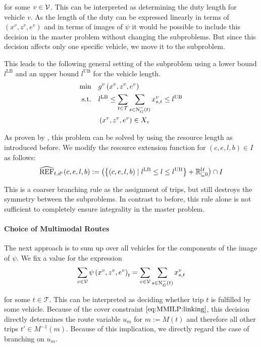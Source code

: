 for some $v\in\mathcal{V}$. This can be interpreted as determining the duty length for vehicle $v$. As the length of the duty can be expressed linearly in terms of $\left(x^v,z^v,e^v\right)$ and in terms of images of $\psi$ it would be possible to include this decision in the master problem without changing the subproblems. But since this decision affects only one specific vehicle, we move it to the subproblem.

This leads to the following general setting of the subproblem using a lower bound $l^{\operatorname{LB}}$ and an upper bound $l^{\operatorname{UB}}$ for the vehicle length.
\begin{align}
	\min \quad & g^v\left(x^v,z^v,e^v\right) \nonumber \\
	\text{s.t.} \quad & l^{\operatorname{LB}} \leq \sum_{t\in\mathcal{T}} \sum_{s\in\operatorname{N}_G^-(t)} x^v_{s,t} \leq l^{\operatorname{UB}} \label{eq:SPv:duty_length} \\
	& \left(x^v,z^v,e^v\right)\in X_v \nonumber
\end{align}

As proven by \cite{Kaiser}, this problem can be solved by using the resource length as introduced before. We modify the resource extension function for $(c,e,l,b)\in I$ as follows:
\begin{align*}
	\widehat{\operatorname{REF}}_{t,d^{\operatorname{e}}}(c,e,l,b) := \left(\left\{(c,e,l,b)\mid l^{\operatorname{LB}}\leq l \leq l^{\operatorname{UB}}\right\} + \mathbb{R}^{\mathcal{U}}_{\sqsubseteq 0}\right) \cap I
\end{align*}

This is a coarser branching rule as the assignment of trips, but still destroys the symmetry between the subproblems. In contrast to before, this rule alone is not sufficient to completely ensure integrality in the master problem.

\paragraph{Choice of Multimodal Routes} \parfill

The next approach is to sum up over all vehicles for the components of the image of $\psi$. We fix a value for the expression
\begin{align*}
	\sum_{v\in\mathcal{V}}\psi\left(x^v,z^v,e^v\right)_t = \sum_{v\in\mathcal{V}} \sum_{s\in\operatorname{N}_G^-(t)} x^v_{s,t}
\end{align*}

for some $t\in\mathcal{T}$. This can be interpreted as deciding whether trip $t$ is fulfilled by some vehicle. Because of the cover constraint $\eqref{eq:MMILP:linking}$, this decision directly determines the route variable $u_m$ for ${m := M(t)}$ and therefore all other trips ${t'\in M^{-1}(m)}$. Because of this implication, we directly regard the case of branching on $u_m$.

